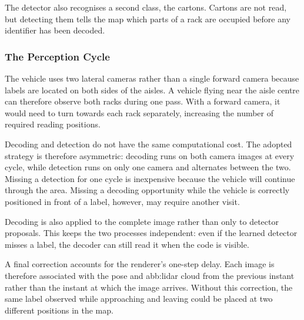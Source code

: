 The detector also recognises a second class, the cartons. Cartons are not read,
but detecting them tells the map which parts of a rack are occupied before any
identifier has been decoded.

\subsubsection*{The Perception Cycle}

The vehicle uses two lateral cameras rather than a single forward camera because
labels are located on both sides of the aisles. A vehicle flying near the aisle
centre can therefore observe both racks during one pass. With a forward camera,
it would need to turn towards each rack separately, increasing the number of
required reading positions.

Decoding and detection do not have the same computational cost. The adopted
strategy is therefore asymmetric: decoding runs on both camera images at every
cycle, while detection runs on only one camera and alternates between the two.
Missing a detection for one cycle is inexpensive because the vehicle will
continue through the area. Missing a decoding opportunity while the vehicle is
correctly positioned in front of a label, however, may require another visit.

Decoding is also applied to the complete image rather than only to detector
proposals. This keeps the two processes independent: even if the learned detector
misses a label, the decoder can still read it when the  code
is visible.

A final correction accounts for the renderer's one-step delay. Each image is
therefore associated with the pose and \gls{abb:lidar} cloud from the previous
instant rather than the instant at which the image arrives. Without this
correction, the same label observed while approaching and leaving could be placed
at two different positions in the map.

